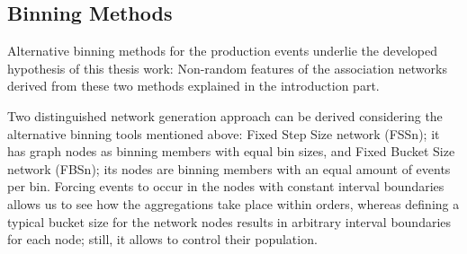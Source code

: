 \subsection*{Binning Methods}
%

Alternative binning methods for the production events underlie the developed hypothesis of this thesis work: Non-random features of the association networks derived from these two methods explained in the introduction part.

Two distinguished network generation approach can be derived considering the alternative binning tools mentioned above: Fixed Step Size network (FSSn); it has graph nodes as binning members with equal bin sizes, and Fixed Bucket Size network (FBSn); its nodes are binning members with an equal amount of events per bin. Forcing events to occur in the nodes with constant interval boundaries allows us to see how the aggregations take place within orders, whereas defining a typical bucket size for the network nodes results in arbitrary interval boundaries for each node; still, it allows to control their population.



\clearpage

